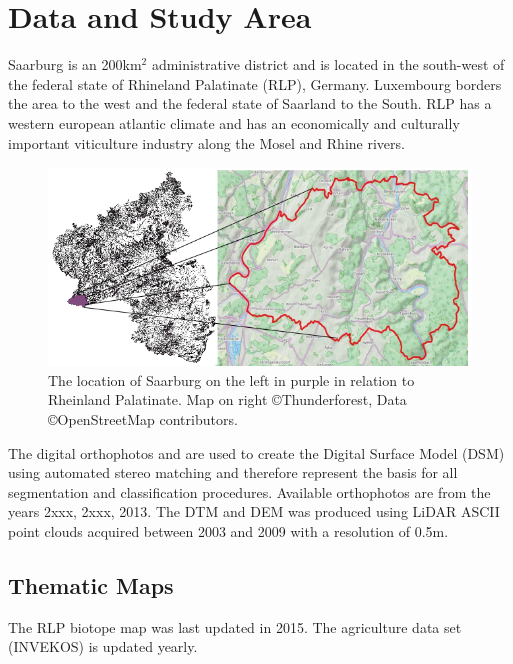 \documentclass[authoryear, review,12pt,number]{elsarticle}
\begin{document}
\section{Data and Study Area}
Saarburg is an 200km$^{2}$ administrative district and is located in the
south-west of the federal state of Rhineland Palatinate (RLP), Germany.
Luxembourg borders the area to the west and the federal state of Saarland to
the South. RLP has a western european atlantic climate and has an economically
and culturally important viticulture industry along the Mosel and Rhine rivers.
\begin{figure}
\label{fig_study_area}
    \includegraphics[width=\textwidth]{diagrams/study_area_closeup.png}
    \caption{The location of Saarburg on the left in purple in relation to
    Rheinland Palatinate. Map on right \copyright Thunderforest, Data
\copyright OpenStreetMap contributors.}
\end{figure}
The digital orthophotos and are used to create the Digital Surface Model (DSM)
using automated stereo matching and therefore represent the basis for all
segmentation and classification procedures.
Available orthophotos are from the years 2xxx, 2xxx, 2013.
The DTM and DEM was produced using LiDAR ASCII point clouds acquired between 2003 and 2009
with a resolution of 0.5m.\\
\subsection{Thematic Maps}
The RLP biotope map was last updated in 2015. The agriculture data set (INVEKOS) is updated yearly. 
\end{document}
